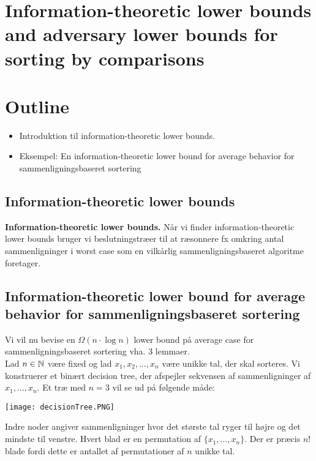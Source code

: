 \section{Information-theoretic lower bounds and adversary lower bounds for sorting by comparisons}

\section*{Outline}
\begin{itemize}
	\item Introduktion til information-theoretic lower bounds.
	\item Eksempel: En information-theoretic lower bound for average behavior for sammenligningsbaseret sortering
\end{itemize}

\subsection*{Information-theoretic lower bounds}

\textbf{Information-theoretic lower bounds.} Når vi finder information-theoretic lower bounds bruger vi beslutningstræer til at ræsonnere fx omkring antal sammenligninger i worst case som en vilkårlig sammenligningsbaseret algoritme foretager. 

\subsection*{Information-theoretic lower bound for average behavior for sammenligningsbaseret sortering}

Vi vil nu bevise en $\Omega(n \cdot \log n)$ lower bound på average case for sammenligningsbaseret sortering vha. 3 lemmaer. \\

Lad $n \in \mathbb{N}$ være fixed og lad $x_1,x_2,\ldots,x_n$ være unikke tal, der skal sorteres. Vi konstruerer et binært decision tree, der afspejler sekvensen af sammenligninger af $x_1,\ldots,x_n$. Et træ med $n=3$ vil se ud på følgende måde:

\begin{center}
	\texttt{[image: decisionTree.PNG]}
\end{center}
Indre noder angiver sammenligninger hvor det største tal ryger til højre og det mindste til venstre. Hvert blad er en permutation af $\{x_1,\ldots,x_n\}$. Der er præcis $n!$ blade fordi dette er antallet af permutationer af $n$ unikke tal. \\


